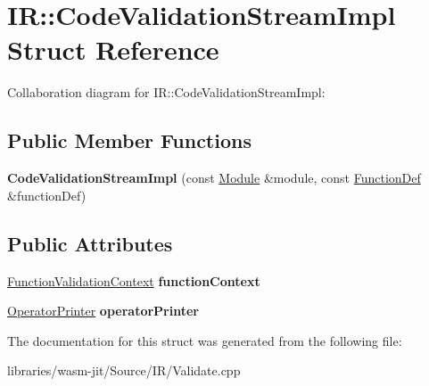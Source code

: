 \hypertarget{struct_i_r_1_1_code_validation_stream_impl}{}\section{IR\+:\+:Code\+Validation\+Stream\+Impl Struct Reference}
\label{struct_i_r_1_1_code_validation_stream_impl}


Collaboration diagram for IR\+:\+:Code\+Validation\+Stream\+Impl\+:
\subsection*{Public Member Functions}
\begin{DoxyCompactItemize}
\item 
\mbox{\label{struct_i_r_1_1_code_validation_stream_impl_a0f627e4ee225e87709cefa4f1fdc224c}} 
{\bfseries Code\+Validation\+Stream\+Impl} (const \mbox{\hyperlink{struct_i_r_1_1_module}{Module}} \&module, const \mbox{\hyperlink{struct_i_r_1_1_function_def}{Function\+Def}} \&function\+Def)
\end{DoxyCompactItemize}
\subsection*{Public Attributes}
\begin{DoxyCompactItemize}
\item 
\mbox{\label{struct_i_r_1_1_code_validation_stream_impl_a9112fae819f30426fe96ce1df8267650}} 
\mbox{\hyperlink{struct_i_r_1_1_function_validation_context}{Function\+Validation\+Context}} {\bfseries function\+Context}
\item 
\mbox{\label{struct_i_r_1_1_code_validation_stream_impl_a87047f079918d733c4cbf4fea0b19a58}} 
\mbox{\hyperlink{struct_i_r_1_1_operator_printer}{Operator\+Printer}} {\bfseries operator\+Printer}
\end{DoxyCompactItemize}


The documentation for this struct was generated from the following file\+:\begin{DoxyCompactItemize}
\item 
libraries/wasm-\/jit/\+Source/\+I\+R/Validate.\+cpp\end{DoxyCompactItemize}
